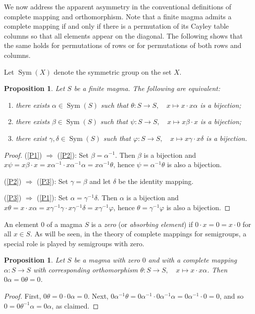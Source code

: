 \documentclass[11pt]{article}
\theoremstyle{plain}
\newtheorem{prop}[theorem]{Proposition}
\theoremstyle{remark}
\theoremstyle{definition}
\theoremstyle{plain}
\newcommand{\inv}{^{-1}}
\newcommand{\Sym}{\mathop{\mathrm{Sym}}}
\begin{document}
We now address the apparent asymmetry in the conventional definitions of complete mapping and orthomorphism. Note that a finite magma admits a complete mapping if and only if there is a permutation of its Cayley table columns so that all elements appear on the diagonal. The following shows that the same holds for permutations of rows or for permutations of both rows and columns.

Let $\Sym(X)$ denote the symmetric group on the set $X$.

\begin{prop}\label{Prp:equivs}
Let $S$ be a finite magma. The following are equivalent:
\begin{enumerate}
\item\label{P1} there exists $\alpha\in \Sym(S)$ such that
$\theta\colon S\to S,\quad x\mapsto x\cdot x\alpha$ is a bijection;
\item\label{P2} there exists $\beta\in \Sym(S)$ such that
$\psi\colon S\to S,\quad x\mapsto x\beta\cdot x$ is a bijection;
\item\label{P3} there exist $\gamma,\delta\in \Sym(S)$ such that
$\varphi\colon S\to S,\quad x\mapsto x\gamma\cdot x\delta$ is a bijection.
\end{enumerate}
\end{prop}
\begin{proof}
(\ref{P1}) $\Rightarrow$ (\ref{P2}): Set $\beta = \alpha\inv$. Then $\beta$ is a bijection and $x\psi = x\beta\cdot x = x\alpha\inv\cdot x\alpha\inv\alpha = x\alpha\inv\theta$, hence $\psi = \alpha\inv\theta$ is also a bijection.

\noindent (\ref{P2}) $\Rightarrow$ (\ref{P3}): Set $\gamma = \beta$ and let $\delta$ be the identity mapping.

\noindent (\ref{P3}) $\Rightarrow$ (\ref{P1}): Set $\alpha = \gamma\inv\delta$. Then $\alpha$ is a bijection and $x\theta = x\cdot x\alpha = x\gamma\inv\gamma \cdot x\gamma\inv\delta = x\gamma\inv\varphi$, hence $\theta = \gamma\inv\varphi$ is also a bijection.
\end{proof}

An element $0$ of a magma $S$ is a \emph{zero} (or \emph{absorbing element}) if $0\cdot x = 0 = x\cdot 0$ for all $x\in S$. As will be seen, in the theory of complete mappings for semigroups, a special role is played by semigroups with zero.

\begin{prop}\label{Prp:zero}
Let $S$ be a magma with zero $0$ and with a complete mapping $\alpha\colon S\to S$ with corresponding orthomorphism $\theta\colon S\to S,\quad x\mapsto x\cdot x\alpha$.
Then $0\alpha = 0\theta = 0$.
\end{prop}
\begin{proof}
First, $0\theta = 0\cdot 0\alpha = 0$. Next,
$0\alpha\inv\theta = 0\alpha\inv\cdot 0\alpha\inv\alpha =
0\alpha\inv\cdot 0 = 0$, and so $0 = 0\theta\inv\alpha = 0\alpha$, as claimed.
\end{proof}
\end{document}
